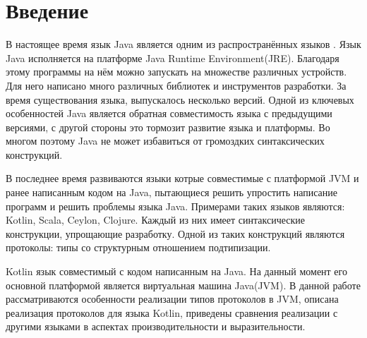 \section*{Введение}

В настоящее время язык Java является одним из распространённых языков \cite{tiobe}. Язык Java исполняется на платформе Java Runtime Environment(JRE). Благодаря этому программы на нём можно запускать на множестве различных устройств. Для него написано много различных библиотек и инструментов разработки. За время существования языка, выпускалось несколько версий. Одной из ключевых особенностей Java является обратная совместимость языка с предыдущими версиями\cite{openjdk:compatibility}, с другой стороны это тормозит развитие языка и платформы. Во многом поэтому Java не может избавиться от громоздких синтаксических конструкций.

В последнее время развиваются языки котрые совместимые с платформой JVM и ранее написанным кодом на Java, пытающиеся решить упростить написание программ и решить проблемы языка Java. Примерами таких языков являются: Kotlin, Scala, Ceylon, Clojure. Каждый из них имеет синтаксические конструкции, упрощающие разработку. Одной из таких конструкций являются протоколы: типы со структурным отношением подтипизации.

Kotlin язык совместимый с кодом написанным на Java. На данный момент его основной платформой является виртуальная машина Java(JVM). В данной работе рассматриваются особенности реализации типов протоколов в JVM, описана реализация протоколов для языка Kotlin, приведены сравнения реализации с другими языками в аспектах производительности и выразительности.
